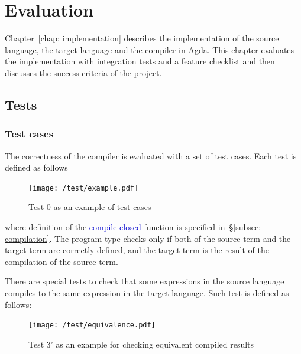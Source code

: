\documentclass[12pt,twoside,a4paper]{report}
\theoremstyle{definition}
\theoremstyle{definition}
\theoremstyle{definition}
\theoremstyle{definition}
\newcommand{\secref}[1]{\S\ref{#1}}
\newcommand{\chapref}[1]{\ref{#1}}
\newcommand{\mb}[1]{\textcolor{mediumblue}{#1}}
\begin{document}
\chapter{Evaluation}
    \minitoc
    Chapter~\chapref{chap: implementation} describes the implementation of the source language, the target language and the compiler in Agda. This chapter evaluates the implementation with integration tests and a feature checklist and then discusses the success criteria of the project.
    \section{Tests}
    \subsection{Test cases}
    The correctness of the compiler is evaluated with a set of test cases. Each test is defined as follows
    \begin{figure}[H]
        \centering
        \texttt{[image: /test/example.pdf]}
        \caption{Test 0 as an example of test cases}
        \label{fig: test_case_0}
    \end{figure}
    where definition of the \mb{\textsf{compile-closed}} function is specified in~\secref{subsec: compilation}. The program type checks only if both of the source term and the target term are correctly defined, and the target term is the result of the compilation of the source term. 

    There are special tests to check that some expressions in the source language compiles to the same expression in the target language. Such test is defined as follows:
    \begin{figure}[H]
        \centering
        \texttt{[image: /test/equivalence.pdf]}
        \caption{Test 3' as an example for checking equivalent compiled results}
        \label{fig: test_case_3'}
    \end{figure}
\end{document}
